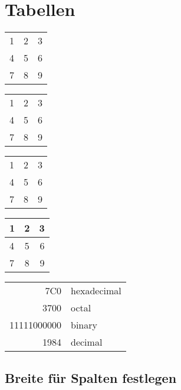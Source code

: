 \documentclass[a4paper,10pt]{scrartcl}
\begin{document}
\newpage
\section{Tabellen}



\begin{tabular}{ l c r }
  1 & 2 & 3 \\
  4 & 5 & 6 \\
  7 & 8 & 9 \\
\end{tabular}



\begin{tabular}{ l | c || r }
  1 & 2 & 3 \\
  4 & 5 & 6 \\
  7 & 8 & 9 \\
\end{tabular}



\begin{tabular}{ l | c || r }
  \hline                        
  1 & 2 & 3 \\
  4 & 5 & 6 \\
  7 & 8 & 9 \\
  \hline  
\end{tabular}



\begin{center}
  \begin{tabular}{ l | c || r }
    \hline
    1 & 2 & 3 \\ \hline
    4 & 5 & 6 \\ \hline
    7 & 8 & 9 \\
    \hline
  \end{tabular}
\end{center}



\begin{tabular}{|r|l|}
  \hline
  7C0 & hexadecimal \\
  3700 & octal \\ \cline{2-2}
  11111000000 & binary \\
  \hline \hline
  1984 & decimal \\
  \hline
\end{tabular}

\newpage
\subsection{Breite für Spalten festlegen}
\end{document}

